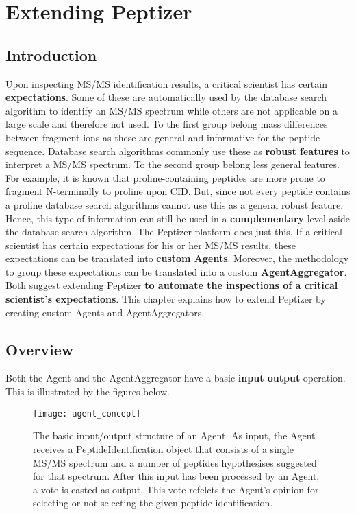 \chapter{Extending Peptizer}
%
\section{Introduction}
\npar Upon inspecting MS/MS identification results, a critical scientist has certain \textbf{expectations}. Some of these are automatically used by the database search algorithm to identify an MS/MS spectrum while others are not applicable on a large scale and therefore not used. To the first group belong mass differences between fragment ions as these are general and informative for the peptide sequence. Database search algorithms commonly use these as \textbf{robust features} to interpret a MS/MS spectrum. To the second group belong less general features. For example, it is known that proline-containing peptides are more prone to fragment N-terminally to proline upon CID. But, since not every peptide contains a proline database search algorithms cannot use this as a general robust feature. Hence, this type of information can still be used in a \textbf{complementary }level aside the database search algorithm.
\npar The Peptizer platform does just this. If a critical scientist has certain expectations for his or her MS/MS results, these expectations can be translated into \textbf{custom Agents}. Moreover, the methodology to group these expectations can be translated into a custom \textbf{AgentAggregator}. Both suggest extending Peptizer \textbf{to automate the inspections of a critical scientist's expectations}.
\npar This chapter explains how to extend Peptizer by creating custom Agents and AgentAggregators.
%
\section{Overview}
\npar Both the Agent and the AgentAggregator have a basic \textbf{input output }operation. This is illustrated by the figures below.


\begin{figure}[H]
\begin{center}
	\texttt{[image: agent\_concept]}
	\caption{\label{agent_concept} The basic input/output structure of an Agent. As input, the Agent receives a PeptideIdentification object that consists of a single MS/MS spectrum and a number of peptides hypothesises suggested for that spectrum. After this input has been processed by an Agent, a vote is casted as output. This vote refelcts the Agent's opinion for selecting or not selecting the given peptide identification.}
\end{center}
\end{figure}
%



